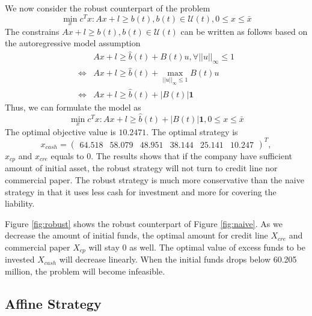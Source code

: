 \documentclass[13pt]{article}
\begin{document}
    We now consider the robust counterpart of the problem
    \begin{equation}\label{eq:robust}
	   \min_x c^Tx: Ax+l\geq b(t), b(t)\in\mathcal{U}(t) ,0\leq x\leq \bar{x}
    \end{equation}
    The constrains $Ax+l\geq b(t), b(t)\in\mathcal{U}(t)$ can be written as follows based on the autoregressive model assumption
    \[\begin{split}
        & Ax+l\geq \hat{b}(t) + B(t)u, \forall ||u||_\infty \leq 1 \\
        \iff & Ax+l\geq \hat{b}(t) + \max_{||u||_\infty \leq 1}B(t)u \\
        \iff & Ax+l\geq \hat{b}(t) + |B(t)|\textbf{1}
    \end{split}\]
    Thus, we can formulate the model as
    \begin{equation}\label{eq:robust_final}
        \min_x c^Tx: Ax+l\geq \hat{b}(t) + |B(t)|\textbf{1}, 0\leq x\leq \bar{x} 
    \end{equation}
    The optimal objective value is $10.2471$. The optimal strategy is 
    \[
        x_{cash} = 
        \begin{pmatrix}
        64.518 & 58.079 & 48.951 & 38.144 & 25.141 & 10.247
        \end{pmatrix}^T,
    \]
    $x_{cp}$ and $x_{cre}$ equals to 0. The results shows that if the company have sufficient amount of initial asset, the robust strategy will not turn to credit line nor commercial paper. The robust strategy is much more conservative than the naive strategy in that it uses less cash for investment and more for covering the liability.

    Figure \ref{fig:robust} shows the robust counterpart of Figure \ref{fig:naive}. As we decrease the amount of initial funds, the optimal amount for credit line $X_{cre}$ and commercial paper $X_{cp}$ will stay 0 as well. The optimal value of excess funds to be invested $X_{cash}$ will decrease linearly. When the initial funds drops below 60.205 million, the problem will become infeasible.


\subsection{Affine Strategy}
\end{document}
